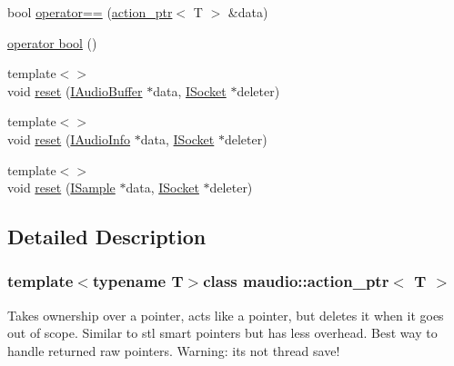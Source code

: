 \begin{DoxyCompactItemize}
\item 
bool \hyperlink{classmaudio_1_1action__ptr_acd03033288a6546eb0d20bb4d37471e1}{operator==} (\hyperlink{classmaudio_1_1action__ptr}{action\-\_\-ptr}$<$ T $>$ \&data)
\item 
\hyperlink{classmaudio_1_1action__ptr_a110db4abbd9d04b9b4713616bcdf6a8a}{operator bool} ()
\item 
{\footnotesize template$<$$>$ }\\void \hyperlink{classmaudio_1_1action__ptr_a530efd1c7751635b2b5339716e3b745f}{reset} (\hyperlink{classmaudio_1_1IAudioBuffer}{I\-Audio\-Buffer} $\ast$data, \hyperlink{classmaudio_1_1ISocket}{I\-Socket} $\ast$deleter)
\item 
{\footnotesize template$<$$>$ }\\void \hyperlink{classmaudio_1_1action__ptr_a0d4c4636362cc43b86b207b6feef5add}{reset} (\hyperlink{classmaudio_1_1IAudioInfo}{I\-Audio\-Info} $\ast$data, \hyperlink{classmaudio_1_1ISocket}{I\-Socket} $\ast$deleter)
\item 
{\footnotesize template$<$$>$ }\\void \hyperlink{classmaudio_1_1action__ptr_a607f59345b453378e36ba91b5171687b}{reset} (\hyperlink{classmaudio_1_1ISample}{I\-Sample} $\ast$data, \hyperlink{classmaudio_1_1ISocket}{I\-Socket} $\ast$deleter)
\end{DoxyCompactItemize}


\subsection{Detailed Description}
\subsubsection*{template$<$typename T$>$class maudio\-::action\-\_\-ptr$<$ T $>$}

Takes ownership over a pointer, acts like a pointer, but deletes it when it goes out of scope. Similar to stl smart pointers but has less overhead. Best way to handle returned raw pointers. Warning\-: its not thread save! 

